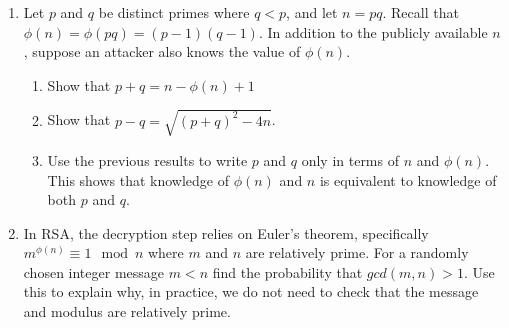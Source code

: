 \documentclass[12pt]{amsart}
\theoremstyle{definition}
\theoremstyle{remark}
\numberwithin{equation}{section}
\begin{document}
\begin{enumerate}
\item Let $p$ and $q$ be distinct primes where $q<p$, and let $n=pq$. Recall that $\phi(n)=\phi(pq)=(p-1)(q-1)$. In addition to the publicly available $n$, suppose an attacker also knows the value of $\phi(n)$. 
\begin{enumerate}
\item Show that $p+q=n-\phi(n)+1$
\item Show that $p-q=\sqrt{\left(p+q\right)^2-4n}$.
\item Use the previous results to write $p$ and $q$ only in terms of $n$ and $\phi(n)$. This shows that knowledge of $\phi(n)$ and $n$ is equivalent to knowledge of both $p$ and $q$.
\end{enumerate}
\item In RSA, the decryption step relies on Euler's theorem, specifically $m^{\phi(n)}\equiv 1\mod n$ where $m$ and $n$ are relatively prime. For a randomly chosen integer message $m<n$ find the probability that $gcd(m,n)>1$. Use this to explain why, in practice, we do not need to check that the message and modulus are relatively prime.
\end{enumerate}
\end{document}
